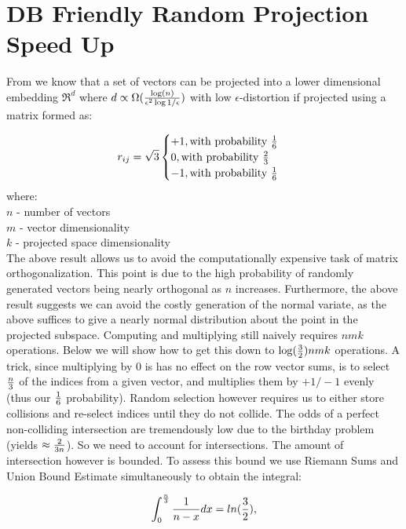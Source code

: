 \section[RP Speedup]{DB Friendly Random Projection Speed Up}

From \cite{Achlioptas01} we know that a set of vectors can be projected into a lower dimensional
embedding $\Re^d$ where $d \propto {\Omega({{ \log(n) }\over {\epsilon^2 \log 1/\epsilon} })}$ with
low $\epsilon$-distortion if projected using a matrix formed as:

$$r_{ij}= \sqrt{3}
\begin{cases}
+1,  \text{with probability } {1 \over 6}\\
0,  \text{with probability } {2 \over 3}\\
-1,  \text{with probability } {1 \over 6}\\
\end{cases}
$$
where: \\
$n$ - number of vectors\\
       $m$ - vector dimensionality\\
       $k$ - projected space dimensionality\\

\noindent
The above result allows us to avoid the computationally expensive task of matrix orthogonalization.
This point is due to the high probability of randomly generated vectors being nearly orthogonal as $n$
increases.  Furthermore, the above result suggests we can avoid the costly generation of the normal
variate, as the above suffices to give a nearly normal distribution about the point in the projected
subspace.  Computing and multiplying still naively requires $nmk$ operations.  Below we will show
how to get this down to $\log({3\over2})nmk$ operations.  A trick, since multiplying by \(0\) is has
no effect on the row vector sums, is to select $n\over 3$ of the indices from a given vector, and
multiplies them by $+1/-1$ evenly (thus our $1\over6$ probability).  Random selection however
requires us to either store collisions and re-select indices until they do not collide.  The odds of
a perfect non-colliding intersection are tremendously low due to the birthday problem (yields
$\approx {{2} \over{3 n}} $).  So we need to account for intersections.  The amount of intersection
however is bounded.  To assess this bound we use Riemann Sums and Union Bound Estimate simultaneously
to obtain the integral:

$${\int ^{n\over3}_0 {1\over{n-x} }dx}= ln({3\over2}),$$


